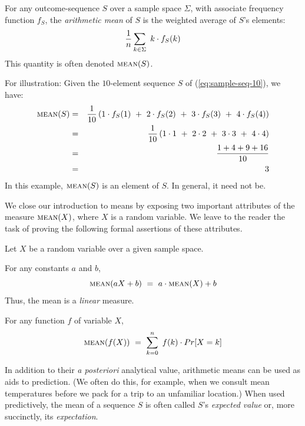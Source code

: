    
For any outcome-sequence $S$ over a sample space $\Sigma$, with associate frequency function $f_S$, the {\it arithmetic mean} of $S$ is the weighted average of $S$'s elements:
\[ {1 \over n} \sum_{k \in \Sigma} \ k \cdot f_S(k) \]
This quantity is often denoted $\mbox{\sc mean}(S)$.  

\smallskip

For illustration: Given the $10$-element sequence $S$ of (\ref{eq:sample-seq-10}), we have:
\begin{eqnarray*}
\mbox{\sc mean}(S) & = &
{1 \over 10} \left(1 \cdot f_S(1) \ + \ 2 \cdot f_S(2) \ + \ 3 \cdot f_S(3) \ + \ 4 \cdot f_S(4) \right) \\
 & = &
{1 \over 10} \left(1 \cdot 1 \ + \ 2 \cdot 2 \ + \ 3 \cdot 3 \ + \ 4 \cdot 4 \right) \\
 & = &
\frac{1 + 4 + 9 + 16}{10} \\
 & = & 3
\end{eqnarray*}
In this example, $\mbox{\sc mean}(S)$ is an element of $S$.  In general, it need not be.

\smallskip

We close our introduction to means by exposing two important attributes of the measure $\mbox{\sc mean}(X)$, where $X$ is a random variable.  We leave to the reader the task of proving the following formal assertions of these attributes.

\begin{prop} 
\label{thm:mean-linear}
Let $X$ be a random variable over a given sample space.

\smallskip

 For any constants $a$ and $b$,
\[ \mbox{\sc mean}(aX+b) \ = \ a \cdot \mbox{\sc mean}(X) + b  \]
Thus, the mean is a {\em linear} measure.

\medskip

 For any function $f$ of variable $X$,
\[ \mbox{\sc mean}(f(X)) \ = \ \sum_{k=0}^n \ f(k) \cdot Pr[X = k] \]
\end{prop}

\bigskip

In addition to their {\em a posteriori} analytical value, arithmetic means can be used as aids to prediction.  (We often do this, for example, when we consult mean temperatures before we pack for a trip to an unfamiliar location.)  When used predictively, the mean of a sequence $S$ is often called $S$'s {\it expected value} or, more succinctly, its {\it expectation}.
 

